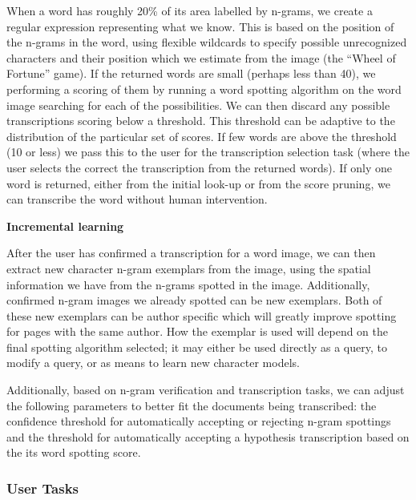 \documentclass[ms]{byuprop}
\begin{document}
{\begin{addmargin}[3em]{3em}
When a word has roughly 20\% of its area labelled by n-grams, we create a regular expression representing what we know. This is based on the position of the n-grams in the word, using flexible wildcards to specify possible unrecognized characters and their position which we estimate from the image (the ``Wheel of Fortune'' game). If the returned words are small (perhaps less than 40), we performing a scoring of them by running a word spotting algorithm on the word image searching for each of the possibilities. We can then discard any possible transcriptions scoring below a threshold. This threshold can be adaptive to the distribution of the particular set of scores. If few words are above the threshold (10 or less) we pass this to the user for the transcription selection task (where the user selects the correct the transcription from the returned words). If only one word is returned, either from the initial look-up or from the score pruning, we can transcribe the word without human intervention.
\\[.5cm]
\end{addmargin}

\textbf{Incremental learning}

\begin{addmargin}[3em]{3em}
After the user has confirmed a transcription for a word image, we can then extract new character n-gram exemplars from the image, using the spatial information we have from the n-grams spotted in the image. Additionally, confirmed n-gram images we already spotted can be new exemplars. Both of these new exemplars can be author specific which will greatly improve spotting for pages with the same author. How the exemplar is used will depend on the final spotting algorithm selected; it may either be used directly as a query, to modify a query, or as means to learn new character models.

Additionally, based on n-gram verification and transcription tasks, we can adjust the following parameters to better fit the documents being transcribed: the confidence threshold for automatically accepting or rejecting n-gram spottings and the threshold for automatically accepting a hypothesis transcription based on the its word spotting score.
\\[.5cm]
\end{addmargin}
}


\subsubsection{User Tasks}
\end{document}
